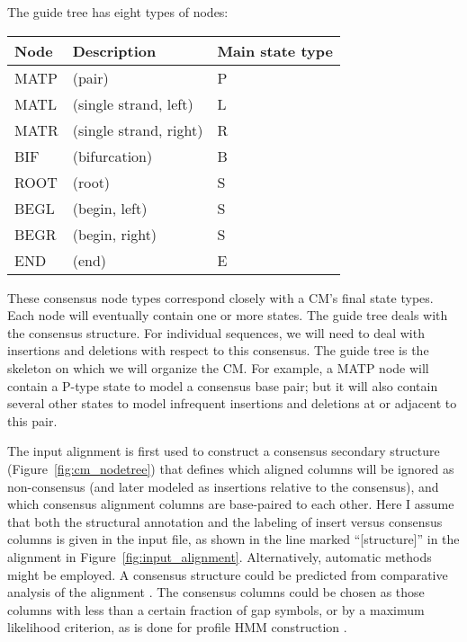 \documentclass[11pt]{article}
\begin{document}
The guide tree has eight types of nodes:

\vspace{0.5em}
\begin{tabular}{lll}
Node      & Description        &  Main state type          \\ \hline
MATP  & (pair)                 & P \\
MATL  & (single strand, left)  & L \\
MATR  & (single strand, right) & R \\
BIF   & (bifurcation)          & B \\
ROOT  & (root)                 & S \\
BEGL  & (begin, left)          & S \\
BEGR  & (begin, right)         & S \\
END   & (end)                  & E \\
\end{tabular}
\vspace{0.5em}
 
These consensus node types correspond closely with a CM's final state
types. Each node will eventually contain one or more states. The guide
tree deals with the consensus structure. For individual sequences, we
will need to deal with insertions and deletions with respect to this
consensus. The guide tree is the skeleton on which we will organize
the CM. For example, a MATP node will contain a P-type state to
model a consensus base pair; but it will also contain several other
states to model infrequent insertions and deletions at or adjacent to
this pair.

The input alignment is first used to construct a consensus secondary
structure (Figure~\ref{fig:cm_nodetree}) that defines which aligned
columns will be ignored as non-consensus (and later modeled as
insertions relative to the consensus), and which consensus alignment
columns are base-paired to each other. Here I assume that both the
structural annotation and the labeling of insert versus consensus
columns is given in the input file, as shown in the line marked
``[structure]'' in the alignment in Figure~\ref{fig:input_alignment}.
Alternatively, automatic methods might be employed. A consensus
structure could be predicted from comparative analysis of the
alignment \cite{Chiu91,Gutell92,Eddy94}.  The consensus columns could
be chosen as those columns with less than a certain fraction of gap
symbols, or by a maximum likelihood criterion, as is done for profile
HMM construction \cite{Krogh94,Durbin98}.
\end{document}
